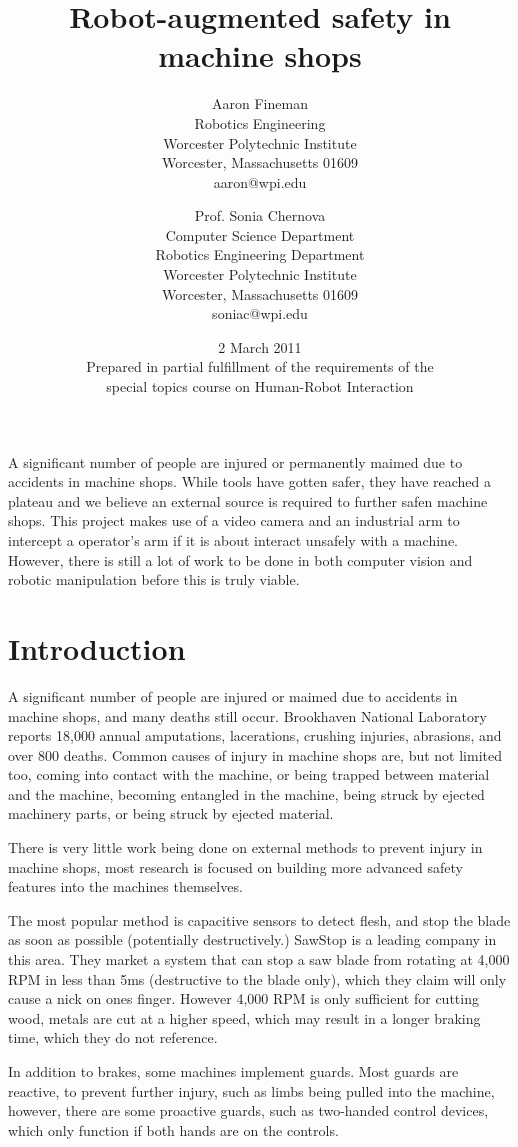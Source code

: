 \documentclass[12pt]{article}
\title{Robot-augmented safety in machine shops\\}
\author{
	Aaron Fineman\\
	\small{Robotics Engineering}\\
	\small{Worcester Polytechnic Institute}\\
	\small{Worcester, Massachusetts 01609}\\
	\small{aaron@wpi.edu}
	\and
	Prof. Sonia Chernova\\
	\small{Computer Science Department}\\
	\small{Robotics Engineering Department}\\
	\small{Worcester Polytechnic Institute}\\
	\small{Worcester, Massachusetts 01609}\\
	\small{soniac@wpi.edu}
}
\date{2 March 2011\\\small{Prepared in partial fulfillment of the requirements of the\\ special topics course on Human-Robot Interaction}}
\begin{document}
\maketitle
\newpage

\abstract
A significant number of people are injured or permanently maimed due to accidents in machine shops. While tools have gotten safer, they have reached a plateau and we believe an external source is required to further safen machine shops. This project makes use of a video camera and an industrial arm to intercept a operator's arm if it is about interact unsafely with a machine. However, there is still a lot of work to be done in both computer vision and robotic manipulation before this is truly viable.

\section{Introduction}
A significant number of people are injured or maimed due to accidents in machine shops, and many deaths still occur. Brookhaven National Laboratory reports 18,000 annual amputations, lacerations, crushing injuries, abrasions, and over 800 deaths\cite{BNL:safety}. Common causes of injury in machine shops are, but not limited too, coming into contact with the machine, or being trapped between material and the machine, becoming entangled in the machine, being struck by ejected machinery parts, or being struck by ejected material\cite{HKUST:safety}.

There is very little work being done on external methods to prevent injury in machine shops, most research is focused on building more advanced safety features into the machines themselves.

The most popular method is capacitive sensors to detect flesh, and stop the blade as soon as possible (potentially destructively.) SawStop is a leading company in this area. They market a system that can stop a saw blade from rotating at 4,000 RPM in less than 5ms (destructive to the blade only), which they claim will only cause a nick on ones finger\cite{sawstop}. However 4,000 RPM is only sufficient for cutting wood, metals are cut at a higher speed, which may result in a longer braking time, which they do not reference.

In addition to brakes, some machines implement guards. Most guards are reactive, to prevent further injury, such as limbs being pulled into the machine, however, there are some proactive guards, such as two-handed control devices, which only function if both hands are on the controls\cite{HKUST:safety}.
\end{document}
